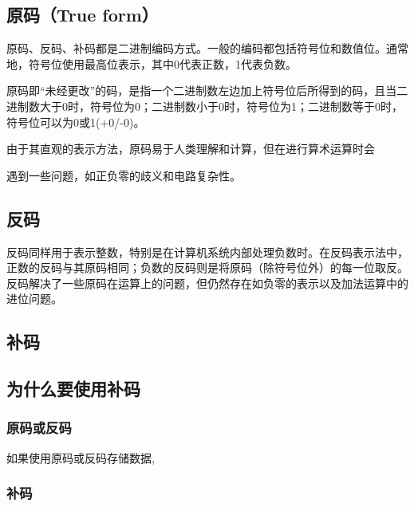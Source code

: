 \begin{issues}
\issueDraft
\end{issues}


\subsection{原码（True form）}

原码、反码、补码都是二进制编码方式。一般的编码都包括符号位和数值位。通常地，符号位使用最高位表示，其中0代表正数，1代表负数。

原码即“未经更改”的码，是指一个二进制数左边加上符号位后所得到的码，且当二进制数大于0时，符号位为0；二进制数小于0时，符号位为1；二进制数等于0时，符号位可以为0或1(+0/-0)。


由于其直观的表示方法，原码易于人类理解和计算，但在进行算术运算时会

遇到一些问题，如正负零的歧义和电路复杂性。

\subsection{反码}

反码同样用于表示整数，特别是在计算机系统内部处理负数时。在反码表示法中，正数的反码与其原码相同；负数的反码则是将原码（除符号位外）的每一位取反。反码解决了一些原码在运算上的问题，但仍然存在如负零的表示以及加法运算中的进位问题。

\subsection{补码}

\subsection{为什么要使用补码}

\subsubsection{原码或反码}

如果使用原码或反码存储数据,

\subsubsection{补码}



